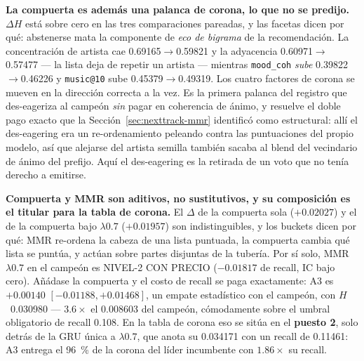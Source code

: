 \documentclass[11pt]{article}
\begin{document}
\textbf{La compuerta es además una palanca de corona, lo que no se predijo.}
$\Delta H$ está sobre cero en las tres comparaciones pareadas, y las facetas dicen
por qué: abstenerse mata la componente de \emph{eco de bigrama} de la
recomendación. La concentración de artista cae
\num{0.69165}$\to$\num{0.59821} y la adyacencia
\num{0.60971}$\to$\num{0.57477} --- la lista deja de repetir un artista --- mientras
\texttt{mood\_coh} \emph{sube} \num{0.39822}$\to$\num{0.46226} y
\texttt{music@10} sube \num{0.45379}$\to$\num{0.49319}. Los cuatro factores de
corona se mueven en la dirección correcta a la vez. Es la primera palanca del
registro que des-eageriza al campeón \emph{sin} pagar en coherencia de ánimo, y
resuelve el doble pago exacto que la Sección~\ref{sec:nexttrack-mmr} identificó como
estructural: allí el des-eagering era un re-ordenamiento peleando contra las
puntuaciones del propio modelo, así que alejarse del artista semilla también sacaba
al blend del vecindario de ánimo del prefijo. Aquí el des-eagering es la retirada de
un voto que no tenía derecho a emitirse.

\textbf{Compuerta y MMR son aditivos, no sustitutivos, y su composición es el
titular para la tabla de corona.} El $\Delta$ de la compuerta sola
($+\num{0.02027}$) y el de la compuerta bajo $\lambda\num{0.7}$
($+\num{0.01957}$) son indistinguibles, y los buckets dicen por qué: MMR
re-ordena la cabeza de una lista puntuada, la compuerta cambia qué lista se
puntúa, y actúan sobre partes disjuntas de la tubería. Por sí solo, MMR
$\lambda\num{0.7}$ en el campeón es NIVEL-2 CON PRECIO ($-\num{0.01817}$ de
recall, IC bajo cero). Añádase la compuerta y el costo de recall se paga
exactamente: A3 es $+\num{0.00140}$ $[-\num{0.01188}, +\num{0.01468}]$, un empate
estadístico con el campeón, con $H$~\num{0.030980} --- $\num{3.6}\times$ el
\num{0.008603} del campeón, cómodamente sobre el umbral obligatorio de recall
\num{0.108}. En la tabla de corona eso se sitúa en el \textbf{puesto 2}, solo
detrás de la GRU única a $\lambda\num{0.7}$, que anota su \num{0.034171} con un
recall de \num{0.11461}: A3 entrega el \SI{96}{\percent} de la corona del líder
incumbente con $\num{1.86}\times$ su recall.
\end{document}
